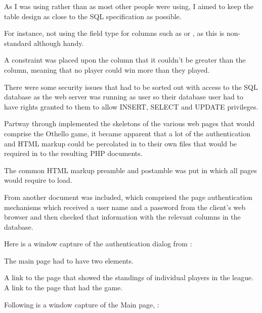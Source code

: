 
\items	As I was using  rather than  as most other people were using, I aimed to keep the table design as close to the SQL specification as possible.

\subitems For instance, not using the  field type for columns such as  or , as this is non-standard although handy.


\items	A constraint was placed upon the  column that it couldn't be greater than the  column, meaning that no player could win more than they played.

\items	There were some security issues that had to be sorted out with access to the SQL database as the web server was running as user  so their database user had to have rights granted to them to allow INSERT, SELECT and UPDATE privileges.


\items	Partway through implemented the skeletons of the various web pages that would comprise the Othello game, it became apparent that a lot of the authentication and HTML markup could be percolated in to their own files that would be required in to the resulting PHP documents.

\items	The common HTML markup preamble and postamble was put in  which all pages would require to load.


\items	From  another document was included, which comprised the page authentication mechanisms which received a user name and a password from the client's web browser and then checked that information with the relevant columns in the database.


\items	Here is a window capture of the authentication dialog from :



\items	The main page had to have two elements.

\subitems	A link to the page that showed the standings of individual players in the league.
\subitems	A link to the page that had the game.


\subitems	Following is a window capture of the Main page, :

